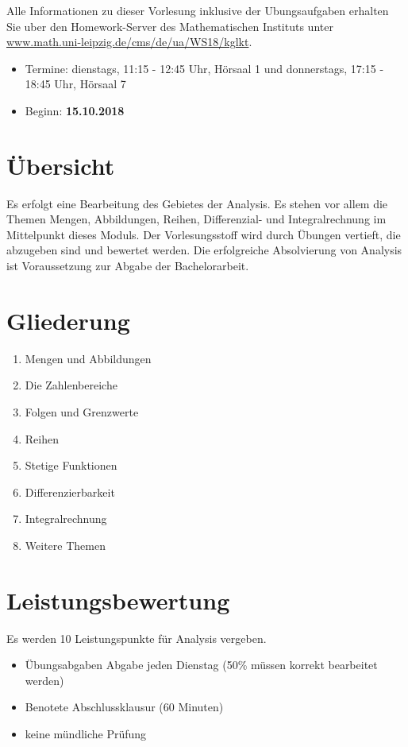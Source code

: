 \documentclass[analysis.tex]{subfiles}
\begin{document}
  Alle Informationen zu dieser Vorlesung inklusive der Ubungsaufgaben erhalten Sie uber den Homework-Server des Mathematischen Instituts
  unter \url{www.math.uni-leipzig.de/cms/de/ua/WS18/kglkt}.

  \begin{itemize}
    \item Termine: dienstags, 11:15 - 12:45 Uhr, H\"orsaal 1 und donnerstags, 17:15 - 18:45 Uhr, H\"orsaal 7
    \item Beginn: \textbf{15.10.2018}
  \end{itemize}

  \section*{\"Ubersicht}
  Es erfolgt eine Bearbeitung des Gebietes der Analysis. Es stehen vor allem die Themen Mengen, Abbildungen, Reihen, Differenzial- und
  Integralrechnung im Mittelpunkt dieses Moduls. Der Vorlesungsstoff wird durch \"Ubungen vertieft, die abzugeben sind und bewertet werden.
  Die erfolgreiche Absolvierung von Analysis ist Voraussetzung zur Abgabe der Bachelorarbeit.

  \section*{Gliederung}
  \begin{enumerate}
    \item Mengen und Abbildungen
    \item Die Zahlenbereiche
    \item Folgen und Grenzwerte
    \item Reihen
    \item Stetige Funktionen
    \item Differenzierbarkeit
    \item Integralrechnung
    \item Weitere Themen
  \end{enumerate}


  \section*{Leistungsbewertung}
  Es werden 10 Leistungspunkte f\"ur Analysis vergeben.
  \begin{itemize}
    \item \"Ubungsabgaben Abgabe jeden Dienstag (50\% m\"ussen korrekt bearbeitet werden)
    \item Benotete Abschlussklausur (60 Minuten)
    \item keine m\"undliche Pr\"ufung
  \end{itemize}
\end{document}
